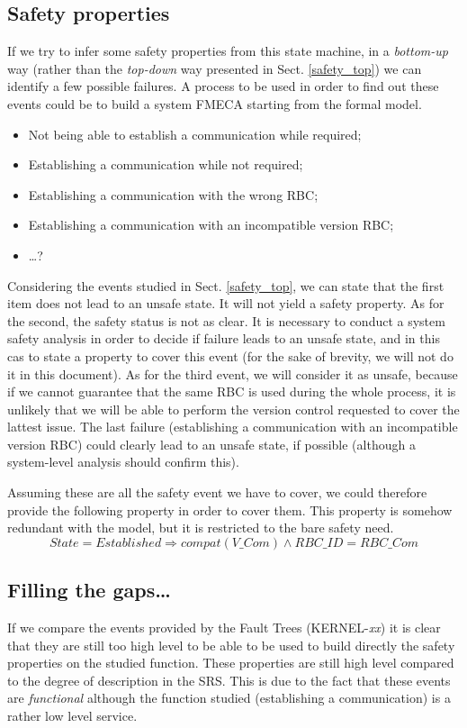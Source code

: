 \documentclass{template/openetcs_article}
\begin{document}
\subsection{Safety properties}
If we try to infer some safety properties from this state machine, in a \emph{bottom-up} way 
(rather than the \emph{top-down} way presented in Sect. \ref{safety_top}) we can identify 
a few possible failures. A process to be used in order to find out these events could be
to build a system FMECA starting from the formal model.
\begin{itemize}
\item Not being able to establish a communication while required;
\item Establishing a communication while not required;
\item Establishing a communication with the wrong RBC;
\item Establishing a communication with an incompatible version RBC;
\item \dots ?
\end{itemize}

Considering the events studied in Sect. \ref{safety_top}, we can state that the first item does 
not lead to an unsafe state. It will not yield a safety property. As for the second, the safety status 
is not as clear. It is necessary to conduct a system safety analysis in order to decide if failure 
leads to an unsafe state, and in this cas to state a property to cover this event
(for the sake of brevity, we will not do it in this document). As for the third event, we will consider
it as unsafe, because if we cannot guarantee that the same RBC is used during the whole process, it is 
unlikely that we will be able to perform the version control requested to cover the lattest issue.
The last failure (establishing a communication with an incompatible version
RBC) could clearly lead to an unsafe state, if possible (although a system-level analysis should 
confirm this).

Assuming these are all the safety event we have to cover, we could therefore provide the following 
property in order to cover them. This property is somehow redundant with the model, but it is restricted
to the bare safety need.
$$State = Established \Rightarrow compat(V\_Com)\wedge RBC\_ID = RBC\_Com$$

\subsection{Filling the gaps\dots}
\label{gaps}
If we compare the events provided by the Fault Trees (KERNEL-\emph{xx}) it is clear that they are 
still too high level to be able to be used to build directly the safety properties on the studied 
function. These properties are still high level compared to the degree of description in the SRS. This 
is due to the fact that these events are \emph{functional} although the function studied (establishing
a communication) is a rather low level service.
\end{document}
